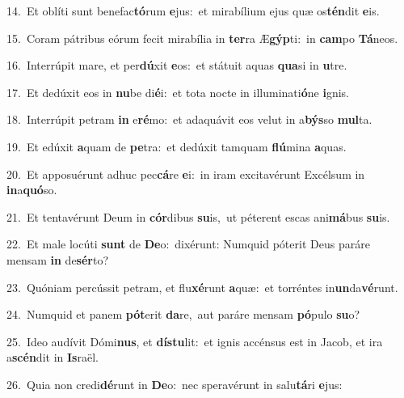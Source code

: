 {\numbfont\textcolor{\numbcolor}{14.}}~Et oblíti sunt benefac\-\textbf{tó}\-rum \textbf{e}\-jus:~\star et mirabílium ejus quæ os\-\textbf{tén}\-dit \textbf{e}\-is.\par
{\numbfont\textcolor{\numbcolor}{15.}}~Coram pátribus eórum fecit mirabília in \textbf{ter}\-ra Æ\-\textbf{gýp}\-ti:~\star in \textbf{cam}\-po \textbf{Tá}\-neos.\par
{\numbfont\textcolor{\numbcolor}{16.}}~Interrúpit mare, et per\-\textbf{dú}\-xit \textbf{e}\-os:~\star et státuit aquas \textbf{qua}\-si in \textbf{u}\-tre.\par
{\numbfont\textcolor{\numbcolor}{17.}}~Et dedúxit eos in \textbf{nu}\-be di\-\textbf{é}\-i:~\star et tota nocte in illuminati\-\textbf{ó}\-ne \textbf{i}\-gnis.\par
{\numbfont\textcolor{\numbcolor}{18.}}~Interrúpit petram \textbf{in} e\-\textbf{ré}\-mo:~\star et adaquávit eos velut in a\-\textbf{býs}\-so \textbf{mul}\-ta.\par
{\numbfont\textcolor{\numbcolor}{19.}}~Et edúxit \textbf{a}\-quam de \textbf{pe}\-tra:~\star et dedúxit tamquam \textbf{flú}\-mina \textbf{a}\-quas.\par
{\numbfont\textcolor{\numbcolor}{20.}}~Et apposuérunt adhuc pec\-\textbf{cá}\-re \textbf{e}\-i:~\star in iram excitavérunt Excélsum in \textbf{in}\-a\-\textbf{quó}\-so.\par
{\numbfont\textcolor{\numbcolor}{21.}}~Et tentavérunt Deum in \textbf{cór}\-dibus \textbf{su}\-is,~\star ut péterent escas ani\-\textbf{má}\-bus \textbf{su}\-is.\par
{\numbfont\textcolor{\numbcolor}{22.}}~Et male locúti \textbf{sunt} de \textbf{De}\-o:~\star dixérunt: Numquid póterit Deus paráre mensam \textbf{in} de\-\textbf{sér}\-to?\par
{\numbfont\textcolor{\numbcolor}{23.}}~Quóniam percússit petram, et flu\-\textbf{xé}\-runt \textbf{a}\-quæ:~\star et torréntes in\-\textbf{un}\-da\-\textbf{vé}\-runt.\par
{\numbfont\textcolor{\numbcolor}{24.}}~Numquid et panem \textbf{pót}\-erit \textbf{da}\-re,~\star aut paráre mensam \textbf{pó}\-pulo \textbf{su}\-o?\par
{\numbfont\textcolor{\numbcolor}{25.}}~Ideo audívit Dómi\-\textbf{nus}\-, et \textbf{dís}\-\textbf{tu}lit:~\star et ignis accénsus est in Jacob, et ira a\-\textbf{scén}\-dit in \textbf{Is}\-raël.\par
{\numbfont\textcolor{\numbcolor}{26.}}~Quia non credi\-\textbf{dé}\-runt in \textbf{De}\-o:~\star nec speravérunt in salu\-\textbf{tá}\-ri \textbf{e}\-jus:\par
